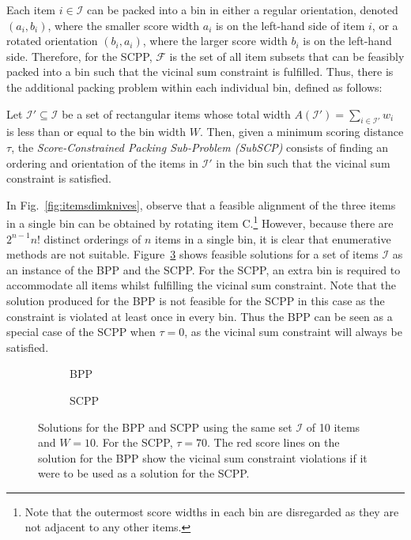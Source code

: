 \documentclass[authoryear]{elsarticle}
\begin{document}
\noindent Each item $i \in \mathcal{I}$ can be packed into a bin in either a regular orientation, denoted $(a_i, b_i)$, where the smaller score width $a_i$ is on the left-hand side of item $i$, or a rotated orientation $(b_i, a_i)$, where the larger score width $b_i$ is on the left-hand side. Therefore, for the SCPP, $\mathcal{F}$ is the set of all item subsets that can be feasibly packed into a bin such that the vicinal sum constraint is fulfilled. Thus, there is the additional packing problem within each individual bin, defined as follows:

\begin{definition}
	Let $\mathcal{I}' \subseteq \mathcal{I}$ be a set of rectangular items whose total width $A(\mathcal{I}') = \sum_{i \in \mathcal{I}'} w_i$ is less than or equal to the bin width $W$. Then, given a minimum scoring distance $\tau$, the \emph{Score-Constrained Packing Sub-Problem (SubSCP)} consists of finding an ordering and orientation of the items in $\mathcal{I}'$ in the bin such that the vicinal sum constraint is satisfied.
	\label{defn:subscp}
\end{definition}


\noindent In Fig.~\ref{fig:itemsdimknives}, observe that a feasible alignment of the three items in a single bin can be obtained by rotating item C.\footnote{Note that the outermost score widths in each bin are disregarded as they are not adjacent to any other items.} However, because there are $2^{n-1} n!$ distinct orderings of $n$ items in a single bin, it is clear that enumerative methods are not suitable. Figure~\ref{fig:bppvscpp} shows feasible solutions for a set of items $\mathcal{I}$ as an instance of the BPP and the SCPP. For the SCPP, an extra bin is required to accommodate all items whilst fulfilling the vicinal sum constraint. Note that the solution produced for the BPP is not feasible for the SCPP in this case as the constraint is violated at least once in every bin. Thus the BPP can be seen as a special case of the SCPP when $\tau=0$, as the vicinal sum constraint will always be satisfied.

\begin{figure}[H]
	\centering	
	\begin{subfigure}[h]{0.37\textwidth}
		
		\caption{BPP}
		\label{fig:bpp}
	\end{subfigure} \hspace{15mm}
	\begin{subfigure}[h]{0.37\textwidth}
		
		\caption{SCPP}
		\label{fig:scpp}
	\end{subfigure}
	\caption{Solutions for the BPP and SCPP using the same set $\mathcal{I}$ of 10 items and $W = 10$. For the SCPP, $\tau = 70$. The red score lines on the solution for the BPP show the vicinal sum constraint violations if it were to be used as a solution for the SCPP.}	
	\label{fig:bppvscpp}
\end{figure}
\end{document}
